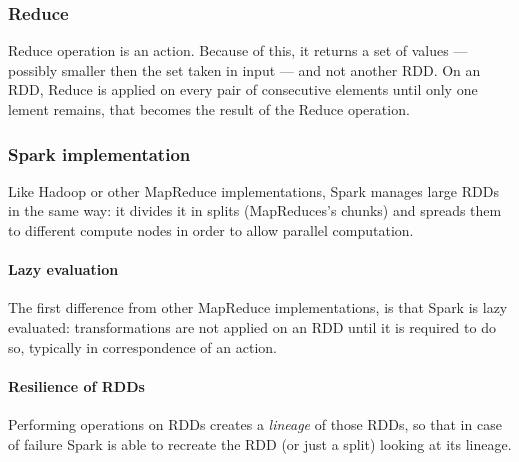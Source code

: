 \documentclass[\main/main.tex]{subfiles}
\begin{document}
\subsubsection{Reduce}
Reduce operation is an action. Because of this, it returns a set of values --- possibly smaller then the set taken in input --- and not another RDD. On an RDD, Reduce is applied on every pair of consecutive elements until only one lement remains, that becomes the result of the Reduce operation.
\subsubsection{Spark implementation}
Like Hadoop or other MapReduce implementations, Spark manages large RDDs in the same way: it divides it in splits (MapReduces's chunks) and spreads them to different compute nodes in order to allow parallel computation.
\paragraph{Lazy evaluation}
The first difference from other MapReduce implementations, is that Spark is lazy evaluated: transformations are not applied on an RDD until it is required to do so, typically in correspondence of an action.
\paragraph{Resilience of RDDs}
Performing operations on RDDs creates a \emph{lineage} of those RDDs, so that in case of failure Spark is able to recreate the RDD (or just a split) looking at its lineage.
\newpage
\end{document}
